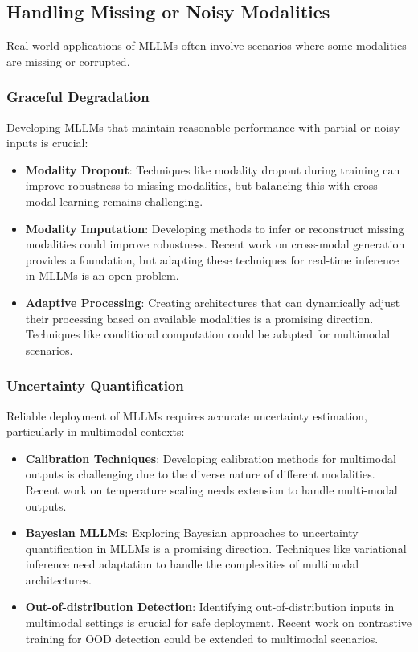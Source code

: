 \subsection{Handling Missing or Noisy Modalities}
Real-world applications of MLLMs often involve scenarios where some modalities are missing or corrupted.

\subsubsection{Graceful Degradation}
Developing MLLMs that maintain reasonable performance with partial or noisy inputs is crucial:

\begin{itemize}
    \item \textbf{Modality Dropout}: Techniques like modality dropout \citep{chen2019uniter} during training can improve robustness to missing modalities, but balancing this with cross-modal learning remains challenging.
    
    \item \textbf{Modality Imputation}: Developing methods to infer or reconstruct missing modalities could improve robustness. Recent work on cross-modal generation \citep{ramesh2021zero} provides a foundation, but adapting these techniques for real-time inference in MLLMs is an open problem.
    
    \item \textbf{Adaptive Processing}: Creating architectures that can dynamically adjust their processing based on available modalities is a promising direction. Techniques like conditional computation \citep{bengio2013estimating} could be adapted for multimodal scenarios.
\end{itemize}

\subsubsection{Uncertainty Quantification}
Reliable deployment of MLLMs requires accurate uncertainty estimation, particularly in multimodal contexts:

\begin{itemize}
    \item \textbf{Calibration Techniques}: Developing calibration methods for multimodal outputs is challenging due to the diverse nature of different modalities. Recent work on temperature scaling \citep{guo2017calibration} needs extension to handle multi-modal outputs.
    
    \item \textbf{Bayesian MLLMs}: Exploring Bayesian approaches to uncertainty quantification in MLLMs is a promising direction. Techniques like variational inference \citep{blei2017variational} need adaptation to handle the complexities of multimodal architectures.
    
    \item \textbf{Out-of-distribution Detection}: Identifying out-of-distribution inputs in multimodal settings is crucial for safe deployment. Recent work on contrastive training for OOD detection \citep{tack2020csi} could be extended to multimodal scenarios.
\end{itemize}

